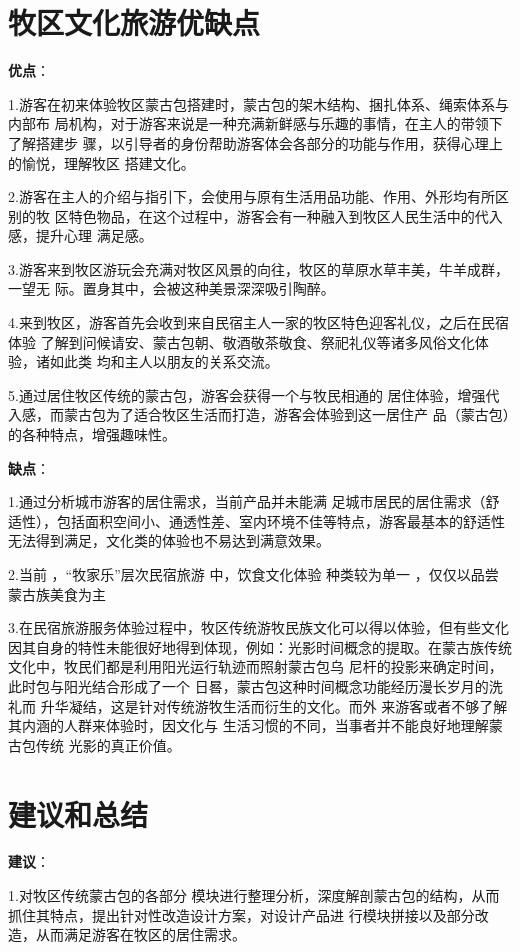 \documentclass[UTF8]{ctexart}
\begin{document}
\section{牧区文化旅游优缺点}
\textbf{优点}：

1.游客在初来体验牧区蒙古包搭建时，蒙古包的架木结构、捆扎体系、绳索体系与内部布
局机构，对于游客来说是一种充满新鲜感与乐趣的事情，在主人的带领下了解搭建步 骤，以引导者的身份帮助游客体会各部分的功能与作用，获得心理上的愉悦，理解牧区 搭建文化。

2.游客在主人的介绍与指引下，会使用与原有生活用品功能、作用、外形均有所区别的牧 区特色物品，在这个过程中，游客会有一种融入到牧区人民生活中的代入感，提升心理
满足感。

3.游客来到牧区游玩会充满对牧区风景的向往，牧区的草原水草丰美，牛羊成群，一望无 际。置身其中，会被这种美景深深吸引陶醉。

4.来到牧区，游客首先会收到来自民宿主人一家的牧区特色迎客礼仪，之后在民宿体验 了解到问候请安、蒙古包朝、敬酒敬茶敬食、祭祀礼仪等诸多风俗文化体验，诸如此类 均和主人以朋友的关系交流。

5.通过居住牧区传统的蒙古包，游客会获得一个与牧民相通的
居住体验，增强代入感，而蒙古包为了适合牧区生活而打造，游客会体验到这一居住产 品（蒙古包）的各种特点，增强趣味性。

\textbf{缺点}：

1.通过分析城市游客的居住需求，当前产品并未能满 足城市居民的居住需求（舒适性），包括面积空间小、通透性差、室内环境不佳等特点，游客最基本的舒适性 无法得到满足，文化类的体验也不易达到满意效果。

2.当前 ，“牧家乐”层次民宿旅游 中，饮食文化体验 种类较为单一 ，仅仅以品尝蒙古族美食为主

3.在民宿旅游服务体验过程中，牧区传统游牧民族文化可以得以体验，但有些文化因其自身的特性未能很好地得到体现，例如：光影时间概念的提取。在蒙古族传统
文化中，牧民们都是利用阳光运行轨迹而照射蒙古包乌 尼杆的投影来确定时间，此时包与阳光结合形成了一个 日晷，蒙古包这种时间概念功能经历漫长岁月的洗礼而 升华凝结，这是针对传统游牧生活而衍生的文化。而外 来游客或者不够了解其内涵的人群来体验时，因文化与 生活习惯的不同，当事者并不能良好地理解蒙古包传统
光影的真正价值。
\section{建议和总结}

\textbf{建议}：

1.对牧区传统蒙古包的各部分 模块进行整理分析，深度解剖蒙古包的结构，从而抓住其特点，提出针对性改造设计方案，对设计产品进 行模块拼接以及部分改造，从而满足游客在牧区的居住需求。
\end{document}
